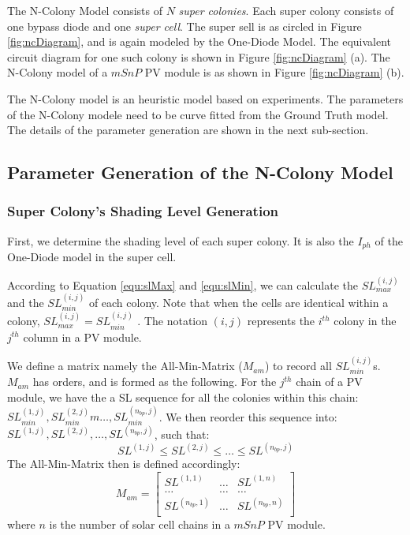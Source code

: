 The N-Colony Model consists of $N$  \textit{super colonies}. Each super colony consists of one bypass diode and one \textit{super cell}. The super sell is as circled in Figure \ref{fig:ncDiagram}, and is again modeled by the One-Diode Model. The equivalent circuit diagram for one such colony is shown in Figure \ref{fig:ncDiagram} (a). The N-Colony model of a $mSnP$ PV module is as shown in Figure \ref{fig:ncDiagram} (b).

The N-Colony model is an heuristic model based on experiments. The parameters of the N-Colony modele need to be curve fitted from the Ground Truth model. The details of the parameter generation are shown in the next sub-section.
\subsection{Parameter Generation of the N-Colony Model}
\subsubsection{Super Colony's Shading Level Generation}
First, we determine the shading level of each super colony. It is also the $I_{ph}$ of the One-Diode model in the super cell.

According to Equation \ref{equ:slMax} and \ref{equ:slMin}, we can calculate the $SL_{max}^{(i,j)}$ and the $SL_{min}^{(i,j)}$ of each colony. Note that when the cells are identical within a colony, $SL_{max}^{(i,j)} = SL_{min}^{(i,j)}$ . The notation $(i,j)$ represents the $i^{th}$ colony in the $j^{th}$ column in a PV module.

We define a matrix namely the All-Min-Matrix ($M_{am}$) to record all $SL_{min}^{(i,j)}$s. $M_{am}$ has orders, and is formed as the following. For the $j^{th}$ chain of a PV module, we have the a SL sequence for all the colonies within this chain: $SL_{min}^{(1,j)},SL_{min}^{(2,j)}m \dots,SL_{min}^{(n_{bp},j)}$. We then reorder this sequence into: $SL^{(1,j)},SL^{(2,j)}, \dots,SL^{(n_{bp},j)}$, such that:
\begin{equation}\label{equ:slChain}
  SL^{(1,j)} \le SL^{(2,j)} \le \dots \le SL^{(n_{bp},j)}
\end{equation}
The All-Min-Matrix then is defined accordingly:
\begin{equation}\label{equ:Mam}
M_{am} =
\begin{bmatrix}
 SL^{(1,1)} & \dots & SL^{(1,n)} \\
 \dots & \dots & \dots \\
 SL^{(n_{bp},1)} & \dots & SL^{(n_{bp},n)} \\
\end{bmatrix}
\end{equation}
where $n$ is the number of solar cell chains in a $mSnP$ PV module.

